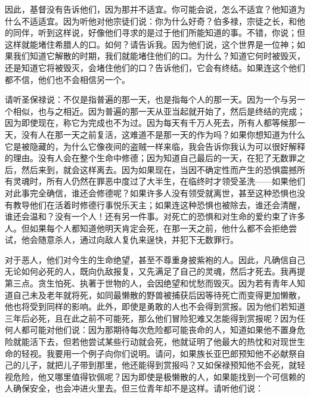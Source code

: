 因此，基督没有告诉他们，因为那并不适宜。你可能会说，怎么不适宜？他知道为什么不适适宜。因为听他对他宗徒们说：你为什么好奇？伯多禄，宗徒之长，和他的同伴，听到这样说，好像他们寻求的是过于他们所能知道的事。不错，你说；但这样就能堵住希腊人的口。如何？请告诉我。因为他们说，这个世界是一位神；如果我们知道它解散的时期，我们就能堵住他们的口。为什么？知道它何时被毁灭，还是知道它将被毁灭，会堵住他们的口？告诉他们，它会有终结。如果连这个他们都不信，他们也不会相信另一个。\par

请听圣保禄说：不仅是指普遍的那一天，也是指每个人的那一天。因为一个与另一个相似，也与之相近。因为普遍的那一天从亚当起就开始了，然后是终结的完成；因为即使现在，称它为完成也不为过。因为每天有千万人死去，所有人都等候那一天，没有人在那一天之前复活，这难道不是那一天的作为吗？如果你想知道为什么它是被隐藏的，为什么它像夜间的盗贼一样来临，我会告诉你我认为可以很好解释的理由。没有人会在整个生命中修德；因为知道自己最后的一天，在犯了无数罪之后，然后来到，就会这样离去。因为如果现在，当因不确定性而产生的恐惧震撼所有灵魂时，所有人仍然在罪恶中度过了大半生，在临终时才领受圣洗——如果他们对此事完全确信，谁还会修德呢？如果许多人没有领受就离世，甚至这种恐惧也没有教导他们在活着时修德行事悦乐天主；如果连这种恐惧也被除去，谁还会清醒，谁还会温和？没有一个人！还有另一件事。对死亡的恐惧和对生命的爱约束了许多人。但如果每个人都知道他明天肯定会死，在那一天之前，他什么都不会拒绝尝试，他会随意杀人，通过向敌人复仇来逞快，并犯下无数罪行。\par

对于恶人，他们对今生的生命绝望，甚至不尊重身披紫袍的人。因此，凡确信自己无论如何必死的人，既向仇敌报复，又先满足了自己的灵魂，然后才死去。我再提第三点。贪生怕死、执著于世物的人，会因绝望和忧愁而毁灭。因为若有青年人知道自己未及老年就将死，如同最懒散的野兽被捕获后因等待死亡而变得更加懒散，他也将受到同样的影响。此外，即使是勇敢的人也不会得到赏报。因为他们若知道三年后必死，且在此之前不可能死，那么他们冒险犯难又怎能得到赏报呢？因为任何人都可能对他们说：因为那期待每次危险都可能丧命的人，知道如果他不置身危险就能活下去，但若他尝试某些行动就会死，他就证明了他最大的热忱和对现世生命的轻视。我要用一个例子向你们说明。请问，如果族长亚巴郎预知他不必献祭自己的儿子，就把儿子带到那里，他还能得到赏报吗？又如保禄预知他不会死，就轻视危险，他又哪里值得钦佩呢？因为即使是极懒散的人，如果能找到一个可信赖的人确保安全，也会冲进火里去。但三位青年却不是这样。请听他们说：\par

